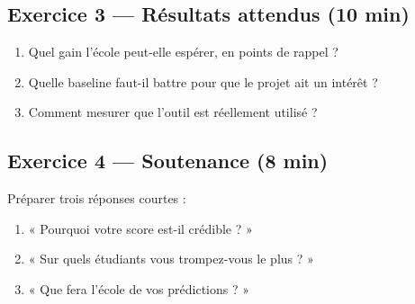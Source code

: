\subsection*{Exercice 3 --- Résultats attendus \hfill \normalfont\footnotesize (10 min)}
\begin{enumerate}
  \item Quel gain l'école peut-elle espérer, en points de rappel ?
  \item Quelle baseline faut-il battre pour que le projet ait un intérêt ?
  \item Comment mesurer que l'outil est réellement utilisé ?
\end{enumerate}

\subsection*{Exercice 4 --- Soutenance \hfill \normalfont\footnotesize (8 min)}
Préparer trois réponses courtes :
\begin{enumerate}
  \item « Pourquoi votre score est-il crédible ? »
  \item « Sur quels étudiants vous trompez-vous le plus ? »
  \item « Que fera l'école de vos prédictions ? »
\end{enumerate}

\newpage
